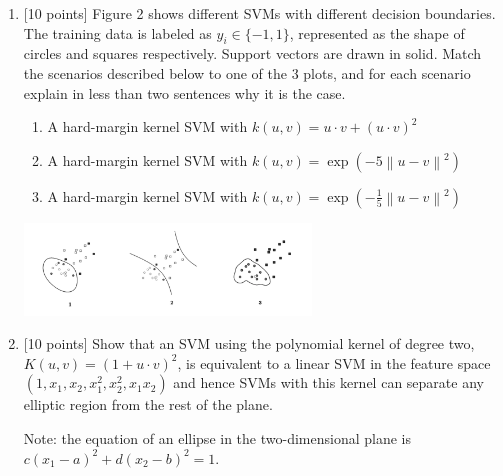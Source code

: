 \documentclass[letterpaper]{article}
\begin{document}
\begin{enumerate}
  
  \item {[10 points]} Figure 2 shows different SVMs with different decision boundaries. The training data is labeled as $y_{i} \in \{-1, 1\}$, represented as the shape of circles and squares respectively. Support vectors are drawn in solid. Match the scenarios described below to one of the 3 plots, and for each scenario explain in less than two sentences why it is the case. 
 
  \begin{enumerate}
  \item A hard-margin kernel SVM with $k(u,v) = u \cdot v + (u \cdot v)^{2} $
  \item A hard-margin kernel SVM with $k(u,v) = \exp(-5 {\left\| u - v \right\|}^2 ) $ 
  \item A hard-margin kernel SVM with $k(u,v) = \exp(- \frac {1}{5} {\left\| u - v \right\|}^2 )$ 
  \end{enumerate}
   
  \includegraphics[width=0.6\textwidth]{SVM.pdf}
  
  
   \item {[10 points]} Show that an SVM using the polynomial kernel of degree two, $K(u, v) = (1 + u \cdot v)^{2}$, is equivalent to a linear SVM in the feature space $(1, x_{1}, x_{2}, x_{1}^{2}, x_{2}^{2}, x_{1}x_{2})$ and hence SVMs with this kernel can separate any elliptic region from the rest of the plane.  
  
  Note: the equation of an ellipse in the two-dimensional plane is $c( x_{1} - a)^{2} +d( x_{2} - b)^{2} = 1$.


\end{enumerate}
\end{document}

